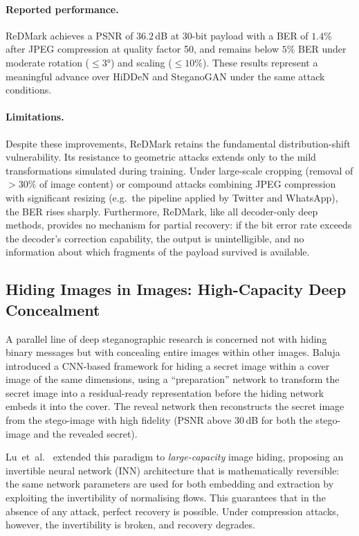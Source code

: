 \documentclass[12pt,a4paper,oneside]{report}
\begin{document}
	\paragraph{Reported performance.}
	ReDMark achieves a PSNR of $36.2$\,dB at $30$-bit payload with a BER of $1.4\%$ after JPEG
	compression at quality factor 50, and remains below $5\%$ BER under moderate rotation ($\leq 3°$)
	and scaling ($\leq 10\%$). These results represent a meaningful advance over HiDDeN and
	SteganoGAN under the same attack conditions.
	
	\paragraph{Limitations.}
	Despite these improvements, ReDMark retains the fundamental distribution-shift vulnerability.
	Its resistance to geometric attacks extends only to the mild transformations simulated during
	training. Under large-scale cropping (removal of $>30\%$ of image content) or compound attacks
	combining JPEG compression with significant resizing (e.g.\ the pipeline applied by Twitter and
	WhatsApp), the BER rises sharply. Furthermore, ReDMark, like all decoder-only deep methods,
	provides no mechanism for partial recovery: if the bit error rate exceeds the decoder's
	correction capability, the output is unintelligible, and no information about which fragments
	of the payload survived is available.
	
	\subsection{Hiding Images in Images: High-Capacity Deep Concealment}
	\label{subsec:hiding_images}
	
	A parallel line of deep steganographic research is concerned not with hiding binary messages
	but with concealing entire images within other images. Baluja \cite{baluja2017hiding} introduced
	a CNN-based framework for hiding a secret image within a cover image of the same dimensions,
	using a ``preparation'' network to transform the secret image into a residual-ready representation
	before the hiding network embeds it into the cover. The reveal network then reconstructs the
	secret image from the stego-image with high fidelity (PSNR above $30$\,dB for both the
	stego-image and the revealed secret).
	
	\noindent
	Lu~et~al.\ \cite{lu2021large} extended this paradigm to \emph{large-capacity} image hiding,
	proposing an invertible neural network (INN) architecture \cite{dinh2017density} that is
	mathematically reversible: the same network parameters are used for both embedding and
	extraction by exploiting the invertibility of normalising flows. This guarantees that in the
	absence of any attack, perfect recovery is possible. Under compression attacks, however, the
	invertibility is broken, and recovery degrades.
	
\end{document}
